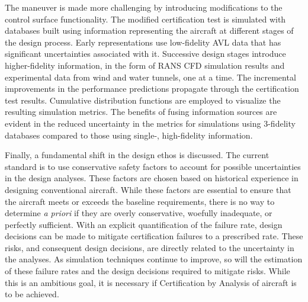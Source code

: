 The maneuver is made more challenging by introducing modifications to the control surface functionality.
The modified certification test is simulated with databases built using information representing the aircraft at different stages of the design process.
Early representations use low-fidelity AVL data that has significant uncertainties associated with it.
Successive design stages introduce higher-fidelity information, in the form of RANS CFD simulation results and experimental data from wind and water tunnels, one at a time.
The incremental improvements in the performance predictions propagate through the certification test results. 
Cumulative distribution functions are employed to visualize the resulting simulation metrics. 
The benefits of fusing information sources are evident in the reduced uncertainty in the metrics for simulations using 3-fidelity databases compared to those using single-, high-fidelity information.

Finally, a fundamental shift in the design ethos is discussed.
The current standard is to use conservative safety factors to account for possible uncertainties in the design analyses.
These factors are chosen based on historical experience in designing conventional aircraft. 
While these factors are essential to ensure that the aircraft meets or exceeds the baseline requirements, there is no way to determine \textit{a priori} if they are overly conservative, woefully inadequate, or perfectly sufficient. 
With an explicit quantification of the failure rate, design decisions can be made to mitigate certification failures to a prescribed rate.
These risks, and consequent design decisions, are directly related to the uncertainty in the analyses.
As simulation techniques continue to improve, so will the estimation of these failure rates and the design decisions required to mitigate risks.
While this is an ambitious goal, it is necessary if Certification by Analysis of aircraft is to be achieved. 




